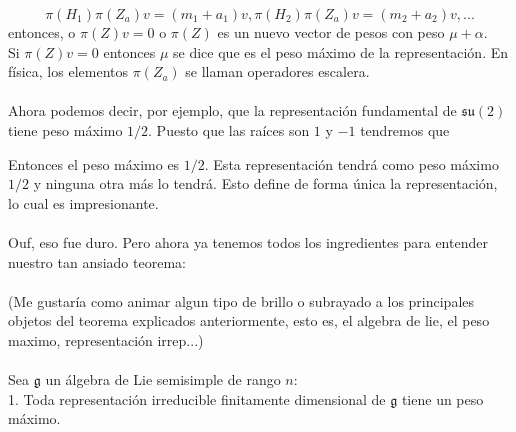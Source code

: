 \documentclass[12pt]{article}
\begin{document}
$$\pi(H_1)\pi(Z_a)v=(m_1+a_1)v, \pi(H_2)\pi(Z_a)v=(m_2+a_2)v, ...$$
entonces, o $\pi(Z)v=0$ o $\pi(Z)$ es un nuevo vector de pesos con peso $\mu+\alpha$. \\ Si $\pi(Z)v=0$ entonces $\mu$ se dice que es el peso máximo de la representación. En física, los elementos $\pi(Z_a)$ se llaman operadores escalera.  \\\\
Ahora podemos decir, por ejemplo, que la representación fundamental de $\mathfrak{s}\mathfrak{u}(2)$ tiene peso máximo $1/2$. Puesto que las raíces son $1$ y $-1$ tendremos que 
\begin{center}
\end{center}
Entonces el peso máximo es $1/2$. Esta representación tendrá como peso máximo $1/2$ y ninguna otra más lo tendrá. Esto define de forma única la representación, lo cual es impresionante.\\\\
Ouf, eso fue duro. Pero ahora ya tenemos todos los ingredientes para entender nuestro tan ansiado teorema:\\\\
(Me gustaría como animar algun tipo de brillo o subrayado a los principales objetos del teorema explicados anteriormente, esto es, el algebra de lie, el peso maximo, representación irrep...)\\\\ 
Sea $\mathfrak{g}$ un álgebra de Lie semisimple de rango $n$:\\
1. Toda representación irreducible finitamente dimensional de $\mathfrak{g}$ tiene un peso máximo.\\
\end{document}
